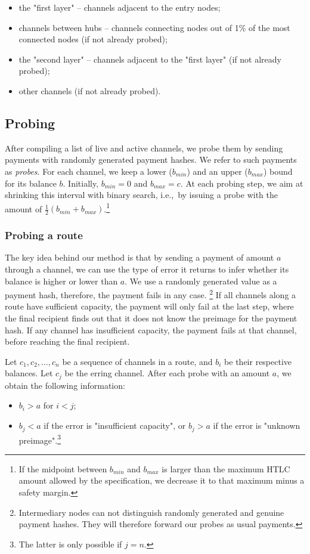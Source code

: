 \begin{itemize}
	\item the "first layer" -- channels adjacent to the entry nodes;
	\item channels between hubs -- channels connecting nodes out of 1\% of the most connected nodes (if not already probed);
	\item the "second layer" -- channels adjacent to the "first layer" (if not already probed);
	\item other channels (if not already probed).
\end{itemize}


\subsection{Probing}

After compiling a list of live and active channels, we probe them by sending payments with randomly generated payment hashes.
We refer to such payments as \textit{probes}.
For each channel, we keep a lower ($b_{min}$) and an upper ($b_{max}$) bound for its balance $b$.
Initially, $b_{min}=0$ and $b_{max}=c$.
At each probing step, we aim at shrinking this interval with binary search, i.e.,~by issuing a probe with the amount of $\frac{1}{2} (b_{min} + b_{max})$.\footnote{If the midpoint between $b_{min}$ and $b_{max}$ is larger than the maximum HTLC amount allowed by the specification, we decrease it to that maximum minus a safety margin.}

\subsubsection*{Probing a route}
The key idea behind our method is that by sending a payment of amount $a$ through a channel, we can use the type of error it returns to infer whether its balance is higher or lower than $a$.
We use a randomly generated value as a payment hash, therefore, the payment fails in any case.
\footnote{Intermediary nodes can not distinguish randomly generated and genuine payment hashes.
They will therefore forward our probes as usual payments.}
If all channels along a route have sufficient capacity, the payment will only fail at the last step, where the final recipient finds out that it does not know the preimage for the payment hash.
If any channel has insufficient capacity, the payment fails at that channel, before reaching the final recipient.

Let $c_1, c_2, \dots, c_n$ be a sequence of channels in a route, and $b_i$ be their respective balances.
Let $c_j$ be the erring channel.
After each probe with an amount $a$, we obtain the following information:
\begin{itemize}
	\item $b_i > a$ for $i<j$;
	\item $b_j < a$ if the error is "insufficient capacity", or $b_j > a$ if the error is "unknown preimage".\footnote{The latter is only possible if $j=n$.}
\end{itemize}

